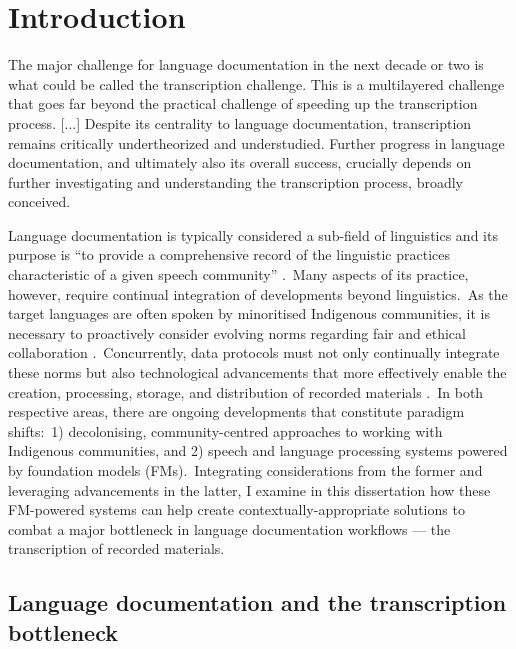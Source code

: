 \documentclass[main.tex]{subfiles}
\begin{document}
\chapter{Introduction}

\setlength{\epigraphwidth}{0.75\textwidth}
\renewcommand{\textflush}{flushepinormal}
\epigraph{The major challenge for language documentation in the next decade or two is what could be called the transcription challenge. This is a multilayered challenge that goes far beyond the practical challenge of speeding up the transcription process. [...] Despite its centrality to language documentation, transcription remains critically undertheorized and understudied. Further progress in language documentation, and ultimately also its overall success, crucially depends on further investigating and understanding the transcription process, broadly conceived.}%
         {\justifying{}}

Language documentation is typically considered a sub-field of linguistics and its purpose is ``to provide a comprehensive record of the linguistic practices characteristic of a given speech community'' \parencite[][p.~166]{himmelmann1998documentary}.~Many aspects of its practice, however, require continual integration of developments beyond linguistics.~As the target languages are often spoken by minoritised Indigenous communities, it is necessary to proactively consider evolving norms regarding fair and ethical collaboration \parencite{holton2022indigenous}.~Concurrently, data protocols must not only continually integrate these norms but also technological advancements that more effectively enable the creation, processing, storage, and distribution of recorded materials \parencite{berez2023recent}.~In both respective areas, there are ongoing developments that constitute paradigm shifts:~1) decolonising, community-centred approaches to working with Indigenous communities, and 2) speech and language processing systems powered by foundation models (FMs).~Integrating considerations from the former and leveraging advancements in the latter, I examine in this dissertation how these FM-powered systems can help create contextually-appropriate solutions to combat a major bottleneck in language documentation workflows --- the transcription of recorded materials.

\section{Language documentation and the transcription bottleneck}
\end{document}
